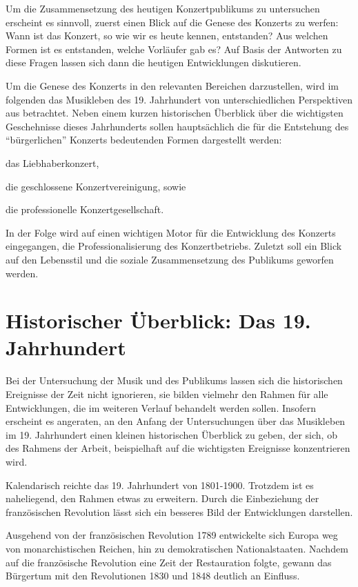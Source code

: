 \documentclass[a4paper, german, oneside]{scrbook}
\begin{document}
Um die Zusammensetzung des heutigen Konzertpublikums zu untersuchen erscheint es sinnvoll, zuerst einen Blick auf die Genese des Konzerts zu werfen: Wann ist das Konzert, so wie wir es heute kennen, entstanden? Aus welchen Formen ist es entstanden, welche Vorläufer gab es? Auf Basis der Antworten zu diese Fragen lassen sich dann die heutigen Entwicklungen diskutieren.

Um die Genese des Konzerts in den relevanten Bereichen darzustellen, wird im folgenden das Musikleben des 19. Jahrhundert von unterschiedlichen Perspektiven aus betrachtet. Neben einem kurzen historischen Überblick über die wichtigsten Geschehnisse dieses Jahrhunderts sollen hauptsächlich die für die Entstehung des \enquote{bürgerlichen} Konzerts bedeutenden Formen dargestellt werden: 
\begin{inparaenum}[(1)]
	\item das Liebhaberkonzert, 
	\item die geschlossene Konzertvereinigung, sowie 
	\item die professionelle Konzertgesellschaft.
\end{inparaenum}

In der Folge wird auf einen wichtigen Motor für die Entwicklung des Konzerts eingegangen, die Professionalisierung des Konzertbetriebs. Zuletzt soll ein Blick auf den Lebensstil und die soziale Zusammensetzung des Publikums geworfen werden.


\section{Historischer Überblick: Das 19. Jahrhundert}
\label{histUberblick}
Bei der Untersuchung der Musik und des Publikums lassen sich die historischen Ereignisse der Zeit nicht ignorieren, sie bilden vielmehr den Rahmen für alle Entwicklungen, die im weiteren Verlauf behandelt werden sollen. Insofern erscheint es angeraten, an den Anfang der Untersuchungen über das Musikleben im 19. Jahrhundert einen kleinen historischen Überblick zu geben, der sich, ob des Rahmens der Arbeit, beispielhaft auf die wichtigsten Ereignisse konzentrieren wird.

Kalendarisch reichte das 19. Jahrhundert von 1801-1900. Trotzdem ist es naheliegend, den Rahmen etwas zu erweitern. Durch die Einbeziehung der französischen Revolution lässt sich ein besseres Bild der Entwicklungen darstellen.

Ausgehend von der französischen Revolution 1789 entwickelte sich Europa weg von monarchistischen Reichen, hin zu demokratischen Nationalstaaten. Nachdem auf die französische Revolution eine Zeit der Restauration folgte, gewann das Bürgertum mit den Revolutionen 1830 und 1848 deutlich an Einfluss. \parencite[vgl.][253ff.]{demandt_kleine_2003}
\end{document}
